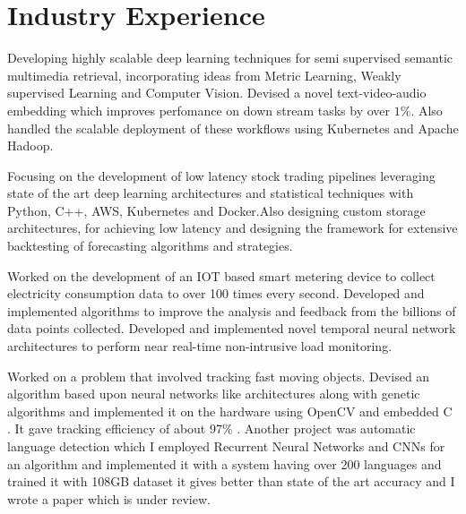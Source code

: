 \documentclass[]{deedy-resume-openfont}
\begin{document}
\section{Industry Experience}


Developing highly scalable deep learning techniques for semi supervised semantic multimedia retrieval, incorporating ideas from Metric Learning, Weakly supervised Learning and Computer Vision. Devised a novel text-video-audio embedding which improves perfomance on down stream tasks by over $1\%$. Also handled the scalable deployment of these workflows using Kubernetes  and Apache Hadoop.
\sectionsep

Focusing on the development of low latency stock trading pipelines leveraging state of the
art deep learning architectures and statistical techniques with Python, C++, AWS, Kubernetes and Docker.Also designing custom storage architectures, for achieving low latency and designing the framework for extensive backtesting of forecasting algorithms and strategies.
\sectionsep

Worked on the development of an IOT based smart metering device to collect electricity consumption data to over 100 times every second. Developed and implemented algorithms to improve the analysis and feedback from the billions of data points collected.
Developed and implemented novel temporal neural network architectures to perform near real-time  non-intrusive load monitoring.

\sectionsep
\vspace{2mm}


Worked on a problem that involved tracking fast moving objects. Devised an algorithm based upon neural networks like architectures along with genetic algorithms and implemented it on the hardware using OpenCV and embedded C . It gave tracking efficiency of about 97\% . 
Another project was automatic language detection which I employed Recurrent Neural Networks and CNNs for an algorithm and implemented it with a system having over 200 languages and trained it with 108GB dataset it gives better than state of the art accuracy and I wrote a paper which is under review.
\end{document}
